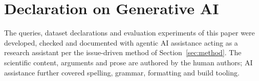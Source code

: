 \documentclass[
]{ceurart}
\begin{document}
\section*{Declaration on Generative AI}
The queries, dataset declarations and evaluation experiments of this paper were
developed, checked and documented with agentic AI assistance acting as a research
assistant per the issue-driven method of Section~\ref{sec:method}. The scientific
content, arguments and prose are authored by the human authors; AI assistance
further covered spelling, grammar, formatting and build tooling.


\end{document}
